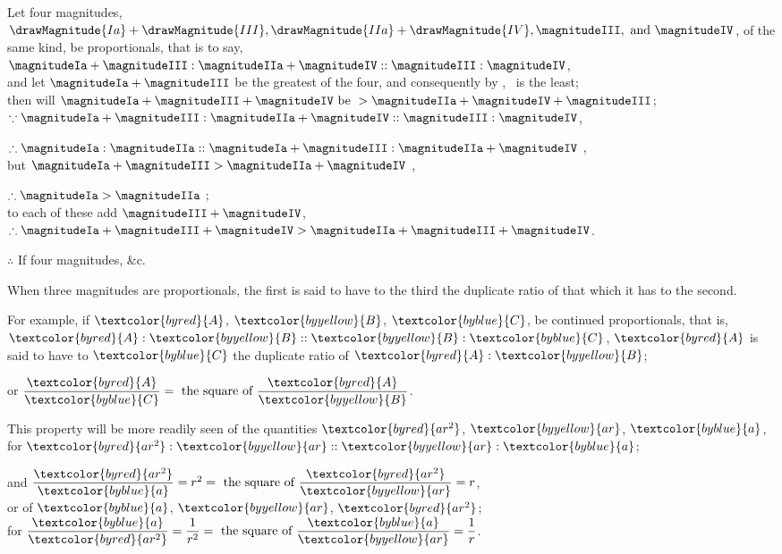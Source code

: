 \documentclass[booklanguage=english]{byrnebook}
\begin{document}
\begin{center}
Let four magnitudes, $\drawMagnitude{Ia} + \drawMagnitude{III}, \drawMagnitude{IIa} + \drawMagnitude{IV}, \magnitudeIII, \mbox{ and } \magnitudeIV$, of the same kind, be proportionals, that is to say,\\
$\magnitudeIa + \magnitudeIII : \magnitudeIIa + \magnitudeIV :: \magnitudeIII : \magnitudeIV$,\\
and let $\magnitudeIa + \magnitudeIII$ be the greatest of the four, and consequently by , \magnitudeIV\ is the least;\\
then will $\magnitudeIa + \magnitudeIII + \magnitudeIV \mbox{ be } > \magnitudeIIa + \magnitudeIV + \magnitudeIII$;\\
$\because \magnitudeIa + \magnitudeIII : \magnitudeIIa + \magnitudeIV :: \magnitudeIII : \magnitudeIV$, %

$\therefore \magnitudeIa : \magnitudeIIa :: \magnitudeIa + \magnitudeIII : \magnitudeIIa + \magnitudeIV$ ,\\
but $\magnitudeIa + \magnitudeIII > \magnitudeIIa + \magnitudeIV$ \byref{\hypref},

$\therefore \magnitudeIa > \magnitudeIIa$ ;\\
to each of these add $\magnitudeIII + \magnitudeIV$,\\
$\therefore \magnitudeIa + \magnitudeIII + \magnitudeIV > \magnitudeIIa + \magnitudeIII + \magnitudeIV$.

$\therefore$ If four magnitudes, \&c.
\end{center}

\vfill\pagebreak

\def\varA{\textcolor{byred}{A}}
\def\varB{\textcolor{byyellow}{B}}
\def\varC{\textcolor{byblue}{C}}
\def\vararS{\textcolor{byred}{ar^2}}
\def\varar{\textcolor{byyellow}{ar}}
\def\vara{\textcolor{byblue}{a}}
When three magnitudes are proportionals, the first is said to have to the third the duplicate ratio of that which it has to the second.

For example, if $\varA$, $\varB$, $\varC$, be continued proportionals, that is, $\varA : \varB :: \varB : \varC$, $\varA$ is said to have to $\varC$ the duplicate ratio of $\varA : \varB$;

\begin{center}
or $\dfrac{\varA}{\varC} = \mbox{ the square of } \dfrac{\varA}{\varB}$.

This property will be more readily seen of the quantities $\vararS$, $\varar$, $\vara$, for $\vararS : \varar :: \varar : \vara$;

and $\dfrac{\vararS}{\vara} = r^2 = \mbox{ the square of } \dfrac{\vararS}{\varar} = r$,\\
or of $\vara$, $\varar$, $\vararS$;\\
for $\dfrac{\vara}{\vararS} = \dfrac{1}{r^2} = \mbox{ the square of } \dfrac{\vara}{\varar} = \dfrac{1}{r}$.
\end{center}
\end{document}
